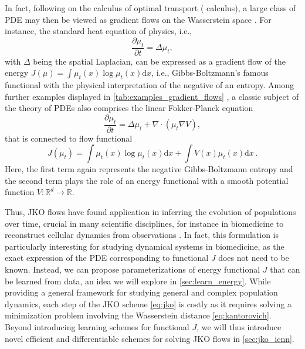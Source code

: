 In fact, following \citet{otto2001geometry} on the calculus of optimal transport (\citeauthor{otto2001geometry} calculus), a large class of \acrlong{PDE} may then be viewed as gradient flows on the Wasserstein space \citep{jordan1998variational}.
For instance, the standard heat equation of physics, i.e.,
\begin{equation*}
	\frac{\partial \mu_t}{\partial t} = \Delta \mu_t,
\end{equation*}
with $\Delta$ being the spatial Laplacian, can be expressed as a gradient flow of the energy $J(\mu) = \int \mu_t(x) \log \mu_t(x) \mathrm{d} x$, i.e., Gibbs-Boltzmann's famous functional with the physical interpretation of the negative of an entropy.
Among further examples displayed in \cref{tab:examples_gradient_flows} \citep{alvarez2021optimizing, villani2021topics}, a classic subject of the theory of PDEs also comprises the linear Fokker-Planck equation
\begin{equation}
	\label{eq:linear_fokker_planck}
	\frac{\partial \mu_t}{\partial t} = \Delta \mu_t+\nabla \cdot(\mu_t \nabla V),
\end{equation}
that is connected to flow functional
\begin{equation*}
	J(\mu_t) = \int \mu_t(x) \log \mu_t(x) \mathrm{d} x+\int V(x) \mu_t(x) \mathrm{d}x\,.
\end{equation*}
Here, the first term again represents the negative Gibbs-Boltzmann entropy and the second term plays the role of an energy functional with a smooth potential function $V: \mathbb{R}^d \rightarrow \mathbb{R}$.


Thus, \acrshort{JKO} flows have found application in inferring the evolution of populations over time, crucial in many scientific disciplines, for instance in biomedicine to reconstruct cellular dynamics from observations \citep{bunne2022proximal, alvarez2021optimizing, mokrov2021large, benamou2016augmented}.
In fact, this formulation is particularly interesting for studying dynamical systems in biomedicine, as the exact expression of the PDE corresponding to functional $J$ does not need to be known.
Instead, we can propose parameterizations of energy functional $J$ that can be learned from data, an idea we will explore in \cref{sec:learn_energy}.
While providing a general framework for studying general and complex population dynamics, each step of the JKO scheme \eqref{eq:jko} is costly as it requires solving a minimization problem involving the Wasserstein distance \eqref{eq:kantorovich}. Beyond introducing learning schemes for functional $J$, we will thus introduce novel efficient and differentiable schemes for solving JKO flows in \cref{sec:jko_icnn}.


